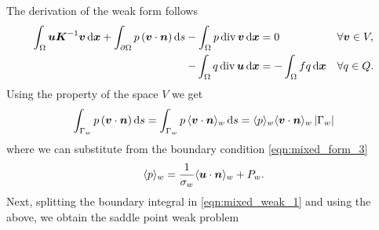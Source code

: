 The derivation of the weak form follows
\begin{align}
    \int_\Omega \vc u \vc K^{-1} \vc v \dd\bx
    + \int_{\prtl\Omega} p \,(\vc v \cdot \vc n) \dd s
    - \int_\Omega p\,\div\, \vc v \dd\bx &= 0 && \forall \vc v\in V, \label{eqn:mixed_weak_1}\\
    - \int_\Omega q\,\div\, \vc u \dd\bx &= - \int_\Omega fq \dd\bx &&  \forall q\in Q. \label{eqn:mixed_weak_2}
\end{align}
Using the property of the space $V$ we get
\begin{equation}
    \int_{\Gamma_w} p \,(\vc v \cdot \vc n) \dd s = \int_{\Gamma_w} p \,\avg{\vc v \cdot \vc n}_w \dd s
    = \avg{p}_w \avg{\vc v \cdot \vc n}_w \abs{\Gamma_w}
\end{equation}
where we can substitute from the boundary condition \eqref{eqn:mixed_form_3}
\begin{equation}
    \avg{p}_w = \frac{1}{\sigma_w}\avg{\vc u\cdot \vc n}_w + P_w.
\end{equation}
Next, splitting the boundary integral in \eqref{eqn:mixed_weak_1} and using the above,
we obtain the saddle point weak problem
%
